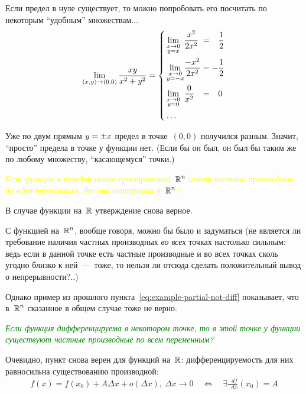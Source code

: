\documentclass[a4paper,12pt]{article}
\newcommand{\diff}{\mathop{}\!d}
\begin{document}
\begin{solution}
    Если предел в нуле существует, то можно попробовать его посчитать по некоторым ``удобным'' множествам...
    \[
      \lim_{(x, y) \to (0, 0)} \frac{xy}{x^2 + y^2} = \left\{
        \begin{alignedat}{3}
          &\lim_{\substack{x \to 0 \\ y = x}} & &\frac{x^2}{2x^2} & &= \hphantom{+}\frac{1}{2}\\
          &\lim_{\substack{x \to 0 \\ y = -x}} & &\frac{-x^2}{2x^2} & &= -\frac{1}{2}\\
          &\lim_{\substack{x \to 0 \\ y = 0}} & &\frac{0}{x^2} & &= \hphantom{+}0\\
          &\ldots
        \end{alignedat}
      \right.
    \]

    Уже по двум прямым $y \hm= \pm x$ предел в точке~$(0, 0)$ получился разным.
    Значит, ``просто'' предела в точке у функции нет.
    (Если бы он был, он был бы таким же по любому множеству, ``касающемуся'' точки.)

    \medskip

    \textcolor{yellow}{
      \emph{Если функция в каждой точке пространства~$\operatorname{\mathbb R}^n$ имеет частные производные по всем переменным, то она непрерывна в~$\operatorname{\mathbb R}^n$?
    }}

    В случае функции на~$\operatorname{\mathbb R}$ утверждение снова верное.

    С функцией на~$\operatorname{\mathbb R}^n$, вообще говоря, можно бы было и задуматься (не является ли требование наличия частных производных \emph{во всех} точках настолько сильным: ведь если в данной точке есть частные производные и во всех точках сколь угодно близко к ней~---~тоже, то нельзя ли отсюда сделать положительный вывод о непрерывности?..)

    Однако пример из прошлого пункта~\eqref{eq:example-partial-not-diff} показывает, что в~$\operatorname{\mathbb R}^n$ сказанное в общем случае тоже не верно.

    \medskip

    \textcolor{green}{
      \emph{Если функция дифференцируема в некотором точке, то в этой точке у функции существуют частные производные по всем переменным?
    }}

    Очевидно, пункт снова верен для функций на~$\operatorname{\mathbb R}$: дифференцируемость для них равносильна существованию производной:
    \begin{equation*}
    \begin{split}
      f(x) = f(x_0) + A \Delta x + o(\Delta x),\  \Delta x \to 0
      \quad \Leftrightarrow\quad
      \exists \frac{\diff f}{\diff x}(x_0) = A
    \end{split}
    \end{equation*}


\end{solution}
\end{document}
